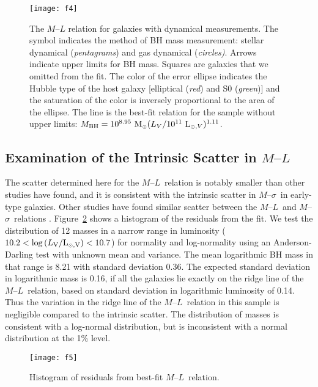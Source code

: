 \documentclass[twosided,letterpaper,numberedappendix]{emulateapj}
\newcommand{\msun}     {\ensuremath{{\rm M}_{\scriptscriptstyle \odot}}}
\newcommand{\msigma}   {\ensuremath{M}{--}\ensuremath{\sigma}}
\newcommand{\ml}       {\ensuremath{M}{--}\ensuremath{L}}
\newcommand{\mlint} {\ensuremath{8.95}}
\newcommand{\mlslope} {\ensuremath{1.11}}
\begin{document}
\begin{figure*}[tb]
\centering
\texttt{[image: f4]}
\caption{The $M$--$L$ relation for galaxies with dynamical
measurements.  The symbol indicates the method of BH mass measurement:
stellar dynamical (\emph{pentagrams}) and gas dynamical
(\emph{circles)}.  Arrows indicate upper limits for BH mass. Squares
are galaxies that we omitted from the fit.  The color of the error
ellipse indicates the Hubble type of the host galaxy [elliptical
(\emph{red}) and S0 (\emph{green})] and the saturation of the color is
inversely proportional to the area of the ellipse.  The line is the
best-fit relation for the sample without upper limits:
$M_{\mathrm{BH}} = 10^{\mlint}~\msun (L_V/10^{11}~{\rm
L}_{{\scriptscriptstyle \odot},V})^{\mlslope}$.}
\label{f:ml}
\end{figure*}




\subsection{Examination of the Intrinsic Scatter in 
\texorpdfstring{$M$--$L$}{M-L}}

The scatter determined here for the \ml\ relation is notably smaller
than other studies have found, and it is consistent with the intrinsic
scatter in \msigma\ in early-type galaxies.  Other studies have found
similar scatter between the \ml\ and \msigma\ relations
\citep[e.g.,][]{mh03}.  Figure~\ref{f:mlresids} shows a histogram of the
residuals from the fit.  We test the distribution of 12 masses in a
narrow range in luminosity ($10.2 < \log{(L_{\mathrm{V}}/{\rm
L}_{{\scriptscriptstyle \odot}\mathrm{,V}}) < 10.7}$) for normality
and log-normality using an Anderson-Darling test with unknown mean and
variance.  The mean logarithmic BH mass in that range is 8.21 with
standard deviation 0.36.  The expected standard deviation in
logarithmic mass is 0.16, if all the galaxies lie exactly on the ridge
line of the \ml\ relation, based on standard deviation in logarithmic
luminosity of 0.14.  Thus the variation in the ridge line of the \ml\
relation in this sample is negligible compared to the intrinsic
scatter.  The distribution of masses is consistent with a log-normal
distribution, but is inconsistent with a normal distribution at the
1\% level.


\begin{figure}
\texttt{[image: f5]}
\caption{Histogram of residuals from best-fit \ml\ relation.}
\label{f:mlresids}
\end{figure}
\end{document}
